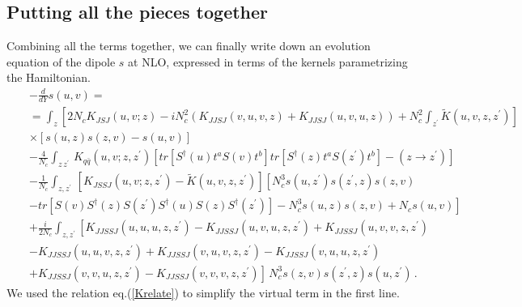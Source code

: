 \documentclass[11pt,a4paper]{article}
\begin{document}
\subsection*{Putting all the pieces together}
Combining all the terms together, we can finally write down an evolution equation of the dipole $s$ at NLO, expressed in terms of the kernels parametrizing
the Hamiltonian. 
\begin{eqnarray}\label{ourdipole}
&&-\frac{d}{dY}s(u,v)  =\nonumber \\
&&=\int_{z}\left[2N_{c}K_{JSJ}(u,v;z)-iN_{c}^{2}\left(K_{JJSJ}(v,u,v,z)+K_{JJSJ}(u,v,u,z)\right)+N_{c}^{2}\int_{z^{\prime}}\widetilde{K}(u,v,z,z^{\prime})\right]\nonumber\\
&&\times \left[s(u,z)s(z,v)-s(u,v)\right]\nonumber\\
&&-\frac{4}{N_{c}}\int_{z\, z^{\prime}}\, K_{q\bar{q}}(u,v;z,z^{\prime})\left[tr\left[S^{\dagger}(u)t^{a}S(v)t^{b}\right]tr\left[S^{\dagger}(z)t^{a}S(z^{\prime})t^{b}\right]-(z\rightarrow z^{\prime})\right]\nonumber \\
&&-\frac{1}{N_{c}}\int_{z,z^{\prime}}\,\left[K_{JSSJ}(u,v;z,z^{\prime})-\widetilde{K}(u,v,z,z^{\prime})\right]
\left[N_{c}^{3}s(u,z^{\prime})s(z^{\prime},z)s(z,v)\right.\nonumber \\
&&\left. -tr\left[S(v)S^{\dagger}(z)S(z^{\prime})S^{\dagger}(u)S(z)S^{\dagger}(z^{\prime})\right]-N_{c}^{3}s(u,z)s(z,v)+N_{c}s(u,v)\right]\nonumber \\
&&+\frac{i}{2N_{c}}\int_{z,z^{\prime}}\left[K_{JJSSJ}(u,u,u,z,z^{\prime})-K_{JJSSJ}(u,v,u,z,z^{\prime})+K_{JJSSJ}(u,v,v,z,z^{\prime})\right. \nonumber \\
&&-K_{JJSSJ}(u,u,v,z,z^{\prime})+K_{JJSSJ}(v,u,v,z,z^{\prime})-K_{JJSSJ}(v,u,u,z,z^{\prime})\nonumber \\
&&\left.+K_{JJSSJ}(v,v,u,z,z^{\prime})-K_{JJSSJ}(v,v,v,z,z^{\prime})\right] \,N_{c}^{3}s(z,v)s(z^{\prime},z)s(u,z^{\prime})\,.
\end{eqnarray}
We used the relation eq.(\ref{Krelate}) to simplify the virtual term in the first line.



\end{document}
